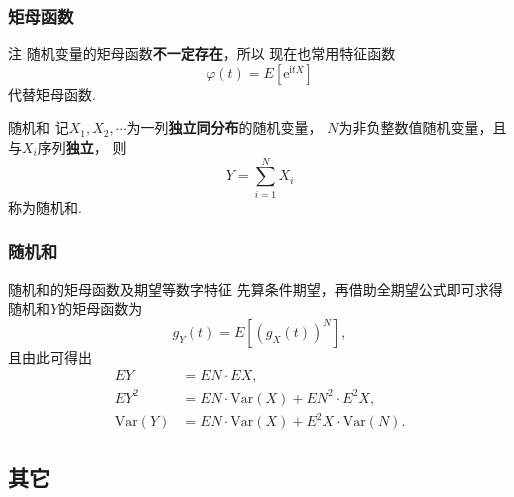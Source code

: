 \begin{frame}
    \frametitle{矩母函数}
    \begin{block}{注}
        随机变量的矩母函数\textbf{不一定存在}，所以
        现在也常用特征函数
        \begin{equation*}
            \varphi(t)=E\left[\mathrm e^{\mathrm itX}\right]
        \end{equation*}
        代替矩母函数. 
    \end{block}
    \begin{exampleblock}{随机和}
        记$X_1,X_2,\cdots$为一列\textbf{独立同分布}的随机变量，
        $N$为非负整数值随机变量，且与$X_i$序列\textbf{独立}，
        则
        \begin{equation*}
            Y=\sum_{i=1}^NX_i
        \end{equation*}
        称为随机和. 


    \end{exampleblock}
\end{frame}

\begin{frame}
    \frametitle{随机和}
    \begin{exampleblock}{随机和的矩母函数及期望等数字特征}
        先算条件期望，再借助全期望公式即可求得
        随机和$Y$的矩母函数为
        \begin{equation}
            g_Y(t)=E\left[(g_X(t))^N\right],
        \end{equation}
        且由此可得出
        \begin{align}\label{eq:random_sum}
            EY&=EN\cdot EX,\\
            EY^2&=EN\cdot\mathrm{Var}(X)+EN^2\cdot E^2X,\\
            \mathrm{Var}(Y)&=EN\cdot \mathrm{Var}(X)+E^2X\cdot\mathrm{Var}(N).
        \end{align}
    \end{exampleblock}
\end{frame}

\subsection{其它}

